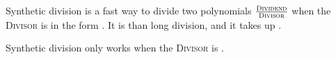 {Synthetic} {division} is a fast way to 
divide two polynomials
$ \frac{\text{\scshape Dividend}}{\text{\scshape Divisor}} $
when the {\scshape Divisor} is in the form .
It is   than long division,
and it takes up  .

\begin{tcolorbox}[center,width=5.5in]
    \centering
    Synthetic division only works when 
    the {\scshape Divisor} is 
    .
\end{tcolorbox}